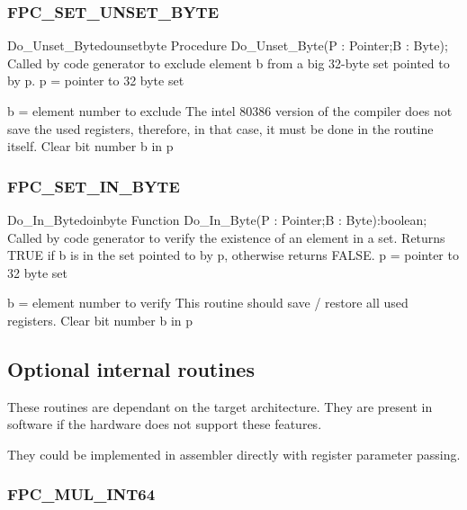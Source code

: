 \documentclass [12pt]{article}
\begin{document}
\subsubsection{FPC{\_}SET{\_}UNSET{\_}BYTE}
\label{subsubsec:mylabel96}

\begin{procedurel}{Do{\_}Unset{\_}Byte}{dounsetbyte}
\Declaration
Procedure Do{\_}Unset{\_}Byte(P : Pointer;B : Byte);
\Description 
Called by code generator to exclude element b from a big 32-byte set pointed
to by p.
\Parameters 
p = pointer to 32 byte set \par b = element number to exclude 
\Notes 
The intel 80386 version of the compiler does not save the used registers,
therefore, in that case, it must be done in the routine itself.
\Algorithm 
Clear bit number b in p
\end{procedurel}

\subsubsection{FPC{\_}SET{\_}IN{\_}BYTE}
\label{subsubsec:mylabel97}

\begin{functionl}{Do{\_}In{\_}Byte}{doinbyte}
\Declaration
Function Do{\_}In{\_}Byte(P : Pointer;B : Byte):boolean;
\Description 
Called by code generator to verify the existence of an element in a set.
Returns TRUE if b is in the set pointed to by p, otherwise returns FALSE.
\Parameters 
p = pointer to 32 byte set \par b = element number to verify 
\Notes 
This routine should save / restore all used registers. 
\Algorithm
Clear bit number b in p
\end{functionl}

\subsection{Optional internal routines}
\label{subsec:optional}

These routines are dependant on the target architecture. They are present in 
software if the hardware does not support these features.

They could be implemented in assembler directly with register parameter 
passing.

\subsubsection{FPC{\_}MUL{\_}INT64}
\label{subsubsec:mylabel98}
\end{document}

